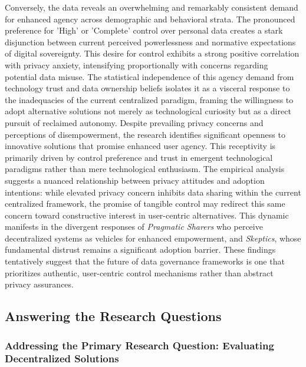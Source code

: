 	Conversely, the data reveals an overwhelming and remarkably consistent demand for enhanced agency across demographic and behavioral strata. The pronounced preference for 'High' or 'Complete' control over personal data creates a stark disjunction between current perceived powerlessness and normative expectations of digital sovereignty. This desire for control exhibits a strong positive correlation with privacy anxiety, intensifying proportionally with concerns regarding potential data misuse. The statistical independence of this agency demand from technology trust and data ownership beliefs isolates it as a visceral response to the inadequacies of the current centralized paradigm, framing the willingness to adopt alternative solutions not merely as technological curiosity but as a direct pursuit of reclaimed autonomy.
	Despite prevailing privacy concerns and perceptions of disempowerment, the research identifies significant openness to innovative solutions that promise enhanced user agency. This receptivity is primarily driven by control preference and trust in emergent technological paradigms rather than mere technological enthusiasm. The empirical analysis suggests a nuanced relationship between privacy attitudes and adoption intentions: while elevated privacy concern inhibits data sharing within the current centralized framework, the promise of tangible control may redirect this same concern toward constructive interest in user-centric alternatives. This dynamic manifests in the divergent responses of \textit{Pragmatic Sharers} who perceive decentralized systems as vehicles for enhanced empowerment, and \textit{Skeptics}, whose fundamental distrust remains a significant adoption barrier. These findings tentatively suggest that the future of data governance frameworks is one that prioritizes authentic, user-centric control mechanisms rather than abstract privacy assurances.
\subsection{Answering the Research Questions}
	\subsubsection{Addressing the Primary Research Question: Evaluating Decentralized Solutions}

